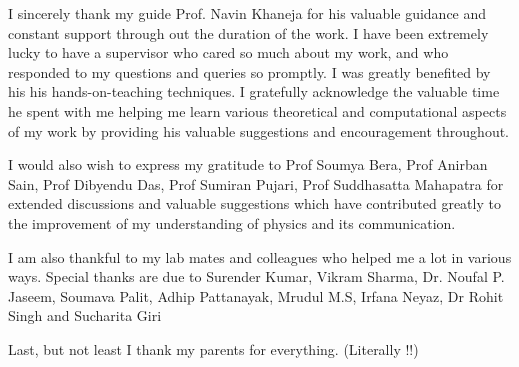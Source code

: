 \acknowledgments
\par I sincerely thank my guide Prof. Navin Khaneja for his valuable guidance and constant support through out the duration of the work. I have been extremely lucky to have
a supervisor who cared so much about my work, and who responded to my questions and queries so
promptly. I was greatly benefited by his his hands-on-teaching techniques. I gratefully acknowledge the valuable time he spent with me helping me learn various theoretical and computational aspects of my work by providing his valuable suggestions and encouragement throughout.
\par 
I would also wish to express my gratitude to Prof Soumya Bera, Prof Anirban Sain, Prof Dibyendu Das, Prof Sumiran Pujari, Prof Suddhasatta Mahapatra for extended discussions and valuable suggestions which have contributed greatly to the improvement of my understanding of physics  and its communication.
\par 
I am also thankful to my lab mates and colleagues who helped me a lot in various ways. Special thanks are due to Surender Kumar, Vikram Sharma, Dr. Noufal P. Jaseem, Soumava Palit, Adhip Pattanayak, Mrudul M.S, Irfana Neyaz,   Dr Rohit Singh and Sucharita Giri
\par
Last, but not least I thank my parents for everything. (Literally !!)





\signature{\today}
\begin{comment}
Post. Doc. Fellow who developed the idea of HHG due to de-
fects in solid. Ms. Irfana Neyaz and Ms. Sucharita Giri, whose academic
discussions and advice were so interesting and useful.
I would like to thank my dear friend and colleague, Jiban Kangsabanik, PhD
student  in our group, for all the
time and efforts they have put in to obtain successful results.
This section is for the acknowledgments. Please keep this brief and resist the temptation of writing flowery prose! Do include all those who helped you, e.g. other faculty/staff you consulted, colleagues who assisted etc.
\end{comment}

